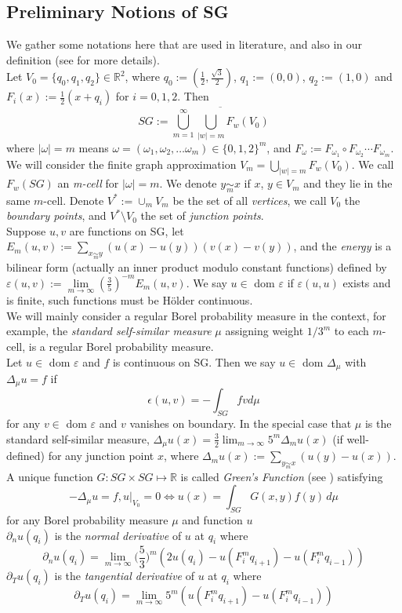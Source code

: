 \documentclass[12pt]{amsart}
\theoremstyle{plain}
\theoremstyle{definition}
\newcommand{\R}{\mathbb{R}} %
\begin{document}
\subsection{Preliminary Notions of SG} We gather some notations here that are used in literature, and also in our definition (see \cite{S} for more details).\\
 Let $V_0 = \{q_0, q_1, q_2\} \in \mathbb{R}^2$, where $q_0:=(\frac 12,\frac{\sqrt 3}2)$, $q_1:=(0,0)$, $q_2:= (1,0)$ and $F_i(x) := \frac{1}{2}(x+q_i)$ for $i=0,1,2$. Then $$SG := \overline{\bigcup_{m=1}^{\infty}\bigcup_{|w|=m}F_w(V_0)}$$ where $|\omega|=m$ means $\omega=(\omega_1,\omega_2,\dots\omega_m)\in\{0,1,2\}^m$, and $F_\omega:=F_{\omega_1} \circ  F_{\omega_2} \cdots F_{\omega_m}$.\\
 We will consider the finite graph approximation $V_m = \bigcup_{|w|=m}F_{w}(V_0)$. We call $F_w(SG)$ an \textit{m-cell} for $|\omega|=m$. We denote $y \underset{m}{\sim} x$ if $x$, $y\in V_m$ and they lie in the same $m$-cell. Denote $V^*:=\cup_m V_m$ be the set of all \textit{vertices}, we call $V_0$ the \textit{boundary points}, and $V^*\setminus V_0$ the set of \textit{junction points}.\\
 Suppose $u,v$ are functions on SG, let $E_m(u,v):=\sum_{x\underset{m}{\sim}y} (u(x)-u(y))(v(x)-v(y))$, and the \textit{energy} is a bilinear form (actually an inner product modulo constant functions) defined by $\varepsilon(u,v):=\lim\limits_{m\to \infty}(\frac 35)^{-m}E_m(u,v)$. We say $u\in$ dom $\varepsilon$ if $\varepsilon(u,u)$ exists and is finite, such functions must be H\"older continuous.
 \\We will mainly consider a regular Borel probability measure in the context, for example, the \textit{standard self-similar measure} $\mu$ assigning weight $1/3^m$ to each $m$-cell, is a regular Borel probability measure.\\
 Let $u\in$ dom $\varepsilon$ and $f$ is continuous on SG. Then we say $u\in$ dom $\Delta_\mu$ with $\Delta_\mu u=f$ if $$\epsilon(u,v)=-\int_{SG}fvd\mu$$ for any $v\in$ dom $\varepsilon$ and $v$ vanishes on boundary. In the special case that $\mu$ is the standard self-similar measure, 
        $\Delta_{\mu}u(x) = \frac{3}{2}\lim_{m \to \infty}5^m\Delta_mu(x)$  (if well-defined)
    for any junction point $x$,
        where $\Delta_mu(x) := \sum_{y \underset{m}{\sim} x}(u(y) - u(x))$. \\
        A unique function $G: SG \times SG \mapsto \R$ is called \textit{Green's Function} (see \cite{S}) satisfying
        $$ -\Delta_\mu u = f, u|_{V_0} = 0 \iff u(x) = \int_{SG}G(x,y)f(y)\,d\mu$$
        for any Borel probability measure $\mu$ and function $u$\\
        $\partial_nu(q_i)$ is the \textit{normal derivative} of $u$ at $q_i$ where
        $$ \partial_nu(q_i) = \lim_{m \to \infty}\Big(\frac{5}{3}\Big)^m(2u(q_i) - u(F^{m}_i q_{i+1}) - u(F^{m}_i q_{i-1}))$$
        $\partial_Tu(q_i)$ is the \textit{tangential derivative} of $u$ at $q_i$ where
        $$ \partial_{T}u(q_i) = \lim_{m\to\infty}5^m(u(F^{m}_i q_{i+1}) - u(F^{m}_iq_{i-1}))$$
\end{document}
